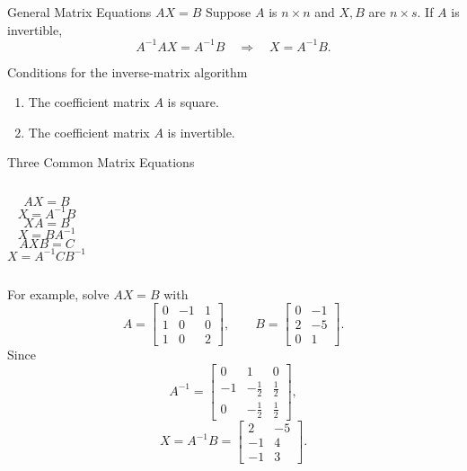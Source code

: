 \begin{frame}{General Matrix Equations $AX=B$}
Suppose $A$ is $n\times n$ and $X,B$ are $n\times s$. If $A$ is invertible,
\[
A^{-1}AX=A^{-1}B
\quad\Longrightarrow\quad
\boxed{X=A^{-1}B}.
\]
\begin{block}{Conditions for the inverse-matrix algorithm}
\begin{enumerate}
  \item The coefficient matrix $A$ is square.
  \item The coefficient matrix $A$ is invertible.
\end{enumerate}
\end{block}
\end{frame}

\begin{frame}[shrink=10]{Three Common Matrix Equations}
\begin{columns}[T]
\centering
\[
AX=B
\]
\[
X=A^{-1}B
\]
\centering
\[
XA=B
\]
\[
X=BA^{-1}
\]
\centering
\[
AXB=C
\]
\[
X=A^{-1}CB^{-1}
\]
\end{columns}
\medskip
For example, solve $AX=B$ with
\[
A=\begin{bmatrix}0&-1&1\\1&0&0\\1&0&2\end{bmatrix},
\qquad
B=\begin{bmatrix}0&-1\\2&-5\\0&1\end{bmatrix}.
\]
Since
\[
A^{-1}=\begin{bmatrix}0&1&0\\-1&-\frac12&\frac12\\0&-\frac12&\frac12\end{bmatrix},
\]
\[
X=A^{-1}B=\begin{bmatrix}2&-5\\-1&4\\-1&3\end{bmatrix}.
\]
\end{frame}

